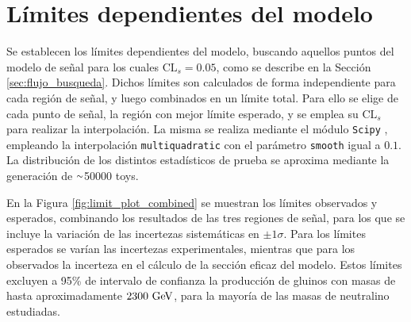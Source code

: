 \section{Límites dependientes del modelo}


Se establecen los límites dependientes del modelo, buscando aquellos puntos del modelo de señal para los cuales $\text{CL}_{s}=0.05$, como se describe en la Sección \ref{sec:flujo_busqueda}. Dichos límites son calculados de forma independiente para cada región de señal, y luego combinados en un límite total. Para ello se elige de cada punto de señal, la región con mejor límite esperado, y se emplea su $\text{CL}_{s}$ para realizar la interpolación. La misma se realiza mediante el módulo \texttt{Scipy} \cite{2020SciPy-NMeth}, empleando la interpolación \texttt{multiquadratic} con el parámetro \texttt{smooth} igual a $0.1$. La distribución de los distintos estadísticos de prueba se aproxima mediante la generación de {$\smallsim$}50000 toys.

En la Figura \ref{fig:limit_plot_combined} se muestran los límites observados y esperados, combinando los resultados de las tres regiones de señal, para los que se incluye la variación de las incertezas sistemáticas en $\pm1\sigma$. Para los límites esperados se varían las incertezas experimentales, mientras que para los observados la incerteza en el cálculo de la sección eficaz del modelo. Estos límites excluyen a 95\% de intervalo de confianza la producción de gluinos con masas de hasta aproximadamente $2300\ \text{GeV}$, para la mayoría de las masas de neutralino estudiadas. 


